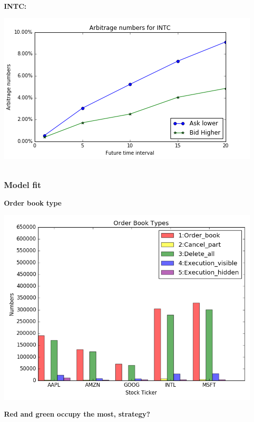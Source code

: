 \documentclass[xcolor={x11names,svgnames,dvipsnames}]{beamer}
\begin{document}
\begin{frame}
\begin{columns}
\begin{column}{.5\textwidth}
			 \textbf{INTC:}
	
										\includegraphics[width=1\textwidth, height=0.4\textheight]{INTC_arbitrage_time.png}

		\end{column}
	\end{columns}

\end{frame}



\begin{frame}
\frametitle{Model fit}
\textbf{Order book type}

\begin{center}	
\includegraphics[width=1\textwidth, height=0.7\textheight]{order_book_type.png}
\end{center}
\textbf{Red and green occupy the most, strategy?}
\end{frame}
\end{document}

